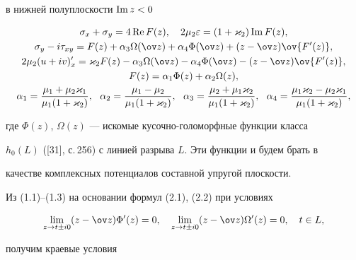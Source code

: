  


в нижней полуплоскости $\operatorname{Im} z<0$ 


\begin{gather} 


\sigma_x+\sigma_y=4\re F(z),\quad 2\mu_2\varepsilon= 


(1+\varkappa_2)\im F(z),\notag\\ 


\sigma_y-i\tau_{xy}=F(z)+\alpha_3\Omega(\ov z)+\alpha_4 


\Phi(\ov z)+(z-\ov z)\ov{F'(z)},\\ 


2\mu_2(u+iv)'_x=\varkappa_2F(z)-\alpha_3\Omega(\ov z)- 


\alpha_4\Phi(\ov z)-(z-\ov z)\ov{F'(z)},\notag \\ 


F(z)=\alpha_1\Phi(z)+\alpha_2\Omega(z),\notag \\ 


\alpha_1=\frac{\mu_1+\mu_2\varkappa_1}{\mu_1(1+\varkappa_2)},\ \ 


\alpha_2=\frac{\mu_1-\mu_2}{\mu_1(1+\varkappa_2)},\ \ 


\alpha_3=\frac{\mu_2+\mu_1\varkappa_2}{\mu_1(1+\varkappa_2)},\ \ 


\alpha_4=\frac{\mu_1\varkappa_2-\mu_2\varkappa_1}{\mu_1(1+\varkappa_2)}, 


\notag 


\end{gather} 


где $\Phi(z)$, $\Omega(z)$ --- искомые кусочно-голоморфные функции класса 


$h_0(L)$ ([31], с.\,256) с линией разрыва $L$. Эти функции и будем брать в 


качестве комплексных потенциалов составной упругой плоскости. 


 


Из (1.1)--(1.3) на основании формул (2.1), (2.2) при условиях 


\begin{equation} 


\lim_{z\to t\pm i0}(z-\ov z)\Phi'(z)=0,\quad 


\lim_{z\to t\pm i0}(z-\ov z)\Omega'(z)=0,\quad t\in L, 


\end{equation} 


получим краевые условия 


